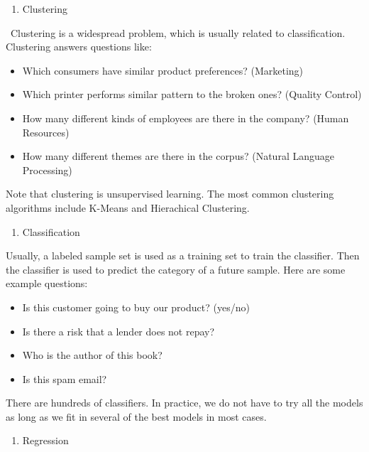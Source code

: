 \documentclass[]{book}
\providecommand{\tightlist}{%
  \setlength{\itemsep}{0pt}\setlength{\parskip}{0pt}}
\theoremstyle{definition}
\theoremstyle{definition}
\theoremstyle{remark}
\begin{document}
\begin{enumerate}
\def\labelenumi{\arabic{enumi}.}
\setcounter{enumi}{2}
\tightlist
\item
  Clustering
\end{enumerate}

~Clustering is a widespread problem, which is usually related to
classification. Clustering answers questions like:

\begin{itemize}
\tightlist
\item
  Which consumers have similar product preferences? (Marketing)
\item
  Which printer performs similar pattern to the broken ones? (Quality
  Control)
\item
  How many different kinds of employees are there in the company? (Human
  Resources)
\item
  How many different themes are there in the corpus? (Natural Language
  Processing)
\end{itemize}

Note that clustering is unsupervised learning. The most common
clustering algorithms include K-Means and Hierachical Clustering.

\begin{enumerate}
\def\labelenumi{\arabic{enumi}.}
\setcounter{enumi}{3}
\tightlist
\item
  Classification
\end{enumerate}

Usually, a labeled sample set is used as a training set to train the
classifier. Then the classifier is used to predict the category of a
future sample. Here are some example questions:

\begin{itemize}
\tightlist
\item
  Is this customer going to buy our product? (yes/no)
\item
  Is there a risk that a lender does not repay?
\item
  Who is the author of this book?
\item
  Is this spam email?
\end{itemize}

There are hundreds of classifiers. In practice, we do not have to try
all the models as long as we fit in several of the best models in most
cases.

\begin{enumerate}
\def\labelenumi{\arabic{enumi}.}
\setcounter{enumi}{4}
\tightlist
\item
  Regression
\end{enumerate}
\end{document}
